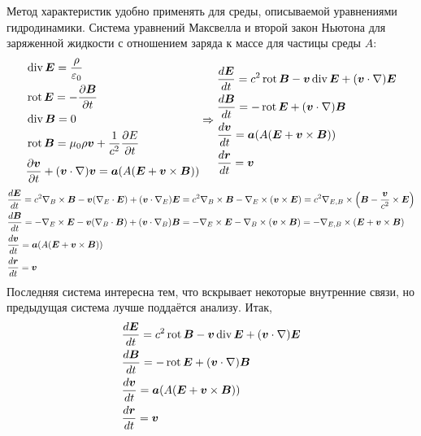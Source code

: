 Метод характеристик удобно применять для среды, описываемой уравнениями гидродинамики. Система уравнений Максвелла и второй закон Ньютона для заряженной жидкости с отношением заряда к массе для частицы среды $A$:
\[
	\begin{aligned}
	& \,\mathrm{div}\, \boldsymbol{E} = \frac{\rho}{\varepsilon_0} \\
	& \,\mathrm{rot}\, \boldsymbol{E} = - \frac{\partial \boldsymbol{B}}{\partial t}\\
	& \,\mathrm{div}\, \boldsymbol{B} = 0 \\
	& \,\mathrm{rot}\, \boldsymbol{B} = \mu_0 \rho \boldsymbol{v} + \frac{1}{c^2} \frac{\partial E}{\partial t} \\
	& \frac{\partial \boldsymbol{v}}{\partial t} + (\boldsymbol{v}\cdot\nabla) \boldsymbol{v} = \boldsymbol{a}(A(\boldsymbol{E} + \boldsymbol{v}\times\boldsymbol{B}))
	\end{aligned}
	\Rightarrow
	\begin{aligned}
	& \frac{d \boldsymbol{E}}{d t} = c^2 \,\mathrm{rot}\, \boldsymbol{B} - \boldsymbol{v} \,\mathrm{div}\, \boldsymbol{E} + (\boldsymbol{v} \cdot \nabla) \boldsymbol{E} \\
	& \frac{d \boldsymbol{B}}{d t} = - \,\mathrm{rot}\, \boldsymbol{E} + (\boldsymbol{v} \cdot \nabla) \boldsymbol{B} \\
	& \frac{d \boldsymbol{v}}{d t} = \boldsymbol{a}(A(\boldsymbol{E} + \boldsymbol{v}\times\boldsymbol{B})) \\
	& \frac{d \boldsymbol{r}}{d t} = \boldsymbol{v}
	\end{aligned}
\] 
\[
	\begin{aligned}
	& \frac{d \boldsymbol{E}}{d t} = c^2 \nabla_B \times \boldsymbol{B} - \boldsymbol{v} (\nabla_E \cdot \boldsymbol{E}) + (\boldsymbol{v} \cdot \nabla_E) \boldsymbol{E} =
		c^2 \nabla_B \times \boldsymbol{B} - \nabla_E \times (\boldsymbol{v} \times \boldsymbol{E}) =
		c^2 \nabla_{E, B} \times \left(\boldsymbol{B} - \frac{\boldsymbol{v}}{c^2} \times \boldsymbol{E}\right) \\
	& \frac{d \boldsymbol{B}}{d t} = -  \nabla_E \times \boldsymbol{E} - \boldsymbol{v} (\nabla_B \cdot \boldsymbol{B}) + (\boldsymbol{v} \cdot \nabla_B) \boldsymbol{B} =
		- \nabla_E \times \boldsymbol{E} - \nabla_B \times (\boldsymbol{v} \times \boldsymbol{B}) =
		- \nabla_{E, B} \times \left(\boldsymbol{E} + \boldsymbol{v} \times \boldsymbol{B}\right) \\
	& \frac{d \boldsymbol{v}}{d t} = \boldsymbol{a}(A(\boldsymbol{E} + \boldsymbol{v}\times\boldsymbol{B})) \\
	& \frac{d \boldsymbol{r}}{d t} = \boldsymbol{v}
	\end{aligned}
\]
Последняя система интересна тем, что вскрывает некоторые внутренние связи, но предыдущая система лучше поддаётся анализу. Итак,
\[
	\begin{aligned}
	& \frac{d \boldsymbol{E}}{d t} = c^2 \,\mathrm{rot}\, \boldsymbol{B} - \boldsymbol{v} \,\mathrm{div}\, \boldsymbol{E} + (\boldsymbol{v} \cdot \nabla) \boldsymbol{E} \\
	& \frac{d \boldsymbol{B}}{d t} = - \,\mathrm{rot}\, \boldsymbol{E} + (\boldsymbol{v} \cdot \nabla) \boldsymbol{B} \\
	& \frac{d \boldsymbol{v}}{d t} = \boldsymbol{a}(A(\boldsymbol{E} + \boldsymbol{v}\times\boldsymbol{B})) \\
	& \frac{d \boldsymbol{r}}{d t} = \boldsymbol{v}
	\end{aligned}
\]
